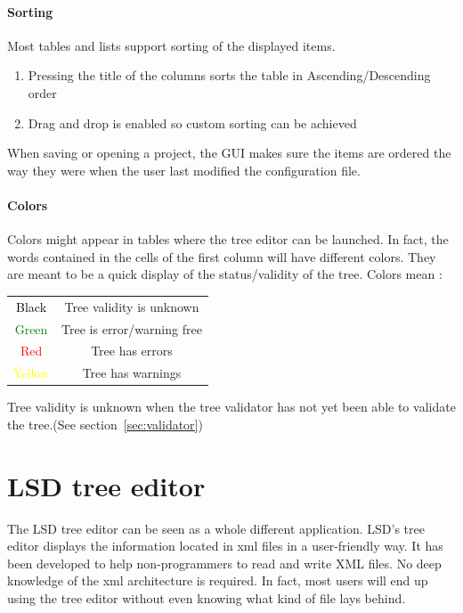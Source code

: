 \documentclass[a4paper,11pt]{report}
\begin{document}
\subsubsection{Sorting}
Most tables and lists support sorting of the displayed items.
\begin{enumerate}
\item{Pressing the title of the columns sorts the table in Ascending/Descending order}
\item{Drag and drop is enabled so custom sorting can be achieved}
\end{enumerate}
When saving or opening a project, the GUI makes sure the items are ordered the way they were when the user last modified the configuration file. 

\subsubsection{Colors}
Colors might appear in tables where the tree editor can be launched. In fact, the words contained in the cells of the first column will have different colors. They are meant to be a quick display of the status/validity of the tree. Colors mean :

\begin{center}
\begin{tabular}{|c c|}
\hline
\textcolor{black}{Black} & Tree validity is unknown \\
\textcolor{green}{Green} & Tree is error/warning free\\
\textcolor{red}{Red}& Tree has errors\\
\textcolor{yellow}{Yellow}& Tree has warnings\\
\hline
\end{tabular}
\end{center}

Tree validity is unknown when the tree validator has not yet been able to validate the tree.(See section~\ref{sec:validator}) 

\chapter{LSD tree editor}
\label{chap:treeEditor}
The LSD tree editor can be seen as a whole different application. LSD's tree editor displays the information located in xml files in a user-friendly way. It has been developed to help non-programmers to read and write XML files. No deep knowledge of the xml architecture is required. In fact, most users will end up using the tree editor without even knowing what kind of file lays behind.
\end{document}
